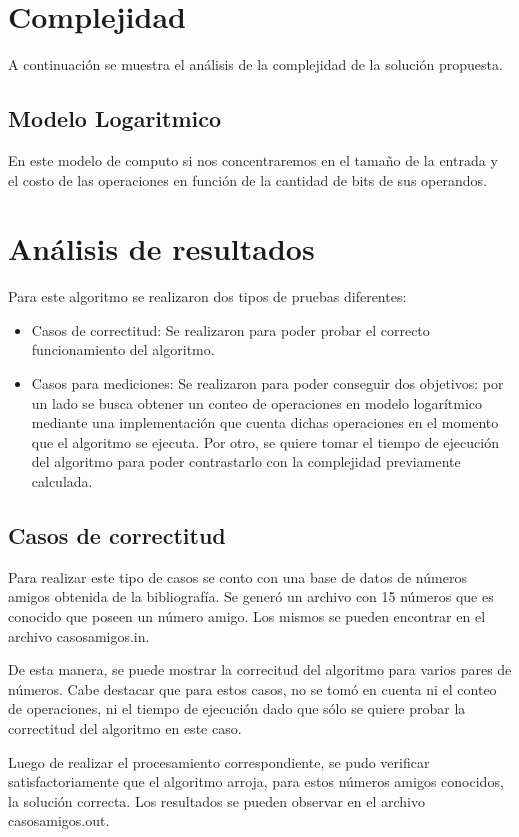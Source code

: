 \documentclass[a4paper, 12pt] {article}
\begin{document}
\section*{Complejidad}
A continuaci\'on se muestra el an\'alisis de la complejidad de la soluci\'on propuesta.
\subsection*{Modelo Logaritmico}
En este modelo de computo si nos concentraremos en el tama\~{n}o de la entrada y el costo de las operaciones en funci\'on de la cantidad de bits de sus operandos.

\section*{An\'alisis de resultados}
Para este algoritmo se realizaron dos tipos de pruebas diferentes:
\begin{itemize}
\item Casos de correctitud: Se realizaron para poder probar el correcto funcionamiento del algoritmo.
\item Casos para mediciones: Se realizaron para poder conseguir dos objetivos: por un lado se busca obtener un conteo de operaciones en modelo logar\'itmico mediante una implementaci\'on que cuenta dichas operaciones en el momento que el algoritmo se ejecuta. Por otro, se quiere tomar el tiempo de ejecuci\'on del algoritmo para poder contrastarlo con la complejidad previamente calculada.
\end{itemize}

\subsection*{Casos de correctitud}
Para realizar este tipo de casos se conto con una base de datos de n\'umeros amigos obtenida de la bibliograf\'ia. Se gener\'o un archivo con 15 n\'umeros que es conocido que poseen un n\'umero amigo. Los mismos se pueden encontrar en el archivo casosamigos.in.

De esta manera, se puede mostrar la correcitud del algoritmo para varios pares de n\'umeros. Cabe destacar que para estos casos, no se tom\'o en cuenta ni el conteo de operaciones, ni el tiempo de ejecuci\'on dado que s\'olo se quiere probar la correctitud del algoritmo en este caso. 

Luego de realizar el procesamiento correspondiente, se pudo verificar satisfactoriamente que el algoritmo arroja, para estos n\'umeros amigos conocidos, la soluci\'on correcta. Los resultados se pueden observar en el archivo casosamigos.out.
\end{document}
